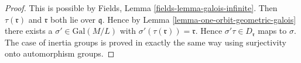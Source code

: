 \documentclass[10pt,a4paper]{amsart}
\theoremstyle{plain}
\theoremstyle{definition}
\theoremstyle{remark}
\numberwithin{equation}{subsection}
\begin{document}
\begin{proof}

This is possible by Fields, Lemma \ref{fields-lemma-galois-infinite}.
Then $\tau(\mathfrak r)$ and $\mathfrak r$ both lie over $\mathfrak q$.
Hence by Lemma \ref{lemma-one-orbit-geometric-galois}
there exists a $\sigma' \in \text{Gal}(M/L)$ with
$\sigma'(\tau(\mathfrak r)) = \mathfrak r$. Hence
$\sigma'\tau \in D_\mathfrak r$ maps to $\sigma$.
The case of inertia groups is proved in exactly the same
way using surjectivity onto automorphism groups.
\end{proof}
\end{document}
